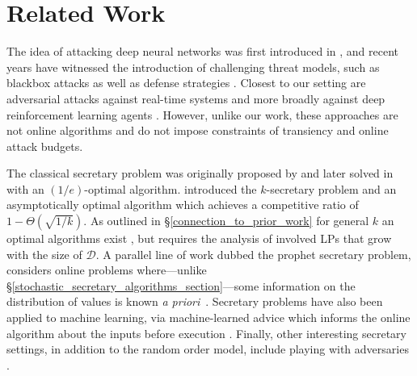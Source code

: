 \section{Related Work}
 The idea of attacking deep neural networks was first introduced in \citep{szegedy2013intriguing,goodfellow2014explaining}, and recent years have witnessed the introduction of challenging threat models, such as blackbox attacks \cite{chen2017zoo,ilyas2018black, jiang2019black,bose2020adversarial,chakraborty2018adversarial} as well as defense strategies \cite{madry2017towards,tramer2017ensemble,Ding2020MMA}.
Closest to our setting are adversarial attacks against real-time systems \cite{gong2019real, gong2019remasc} and more broadly against deep reinforcement learning agents \cite{lin2017tactics,sun2020stealthy}. However, unlike our work, these approaches are not online algorithms and do not impose constraints of transiency and online attack budgets. 

 The classical secretary problem was originally proposed by \cite{gardner1960mathematical} and later solved in \cite{dynkin1963optimum} with an $(1/e)$-optimal algorithm. \citet{kleinberg2005multiple} introduced the $k$-secretary problem and an asymptotically optimal algorithm which achieves a competitive ratio of $1 - \Theta(\sqrt{1/k})$. 
As outlined in \S\ref{connection_to_prior_work} for general $k$ an optimal algorithms exist \cite{chan2014revealing}, but requires the analysis of involved LPs that grow with the size of $\mathcal{D}$. A parallel line of work dubbed the prophet secretary problem, considers online problems where---unlike \S\ref{stochastic_secretary_algorithms_section}---some information on the distribution of values is known \textit{a priori}~\cite{azar2014prophet, azar2018prophet, esfandiari2017prophet}. Secretary problems have also been applied to machine learning, via machine-learned advice which informs the online algorithm about the inputs before execution \cite{antoniadis2020secretary,dutting2020secretaries}. 
Finally, other interesting secretary settings, in addition to the random order model, include playing with adversaries \cite{bradac2019robust, kaplan2020competitive}.




